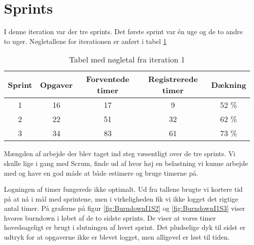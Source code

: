 \section{Sprints}

I denne iteration var der tre sprints. Det første sprint var én uge og de to andre to uger.
Nøgletallene for iterationen er anført i tabel \ref{table:iteration1sprints}

\begin{table}
\centering
\begin{tabular}{|c|c|c|c|c|}
\hline 
\textbf{Sprint} 	& \textbf{Opgaver} 	& \textbf{Forventede timer} 	& \textbf{Registrerede timer} 	& \textbf{Dækning} \\ 
\hline
1 		& 16 		& 17 				& 9 						& 52 \% \\ 
\hline 
2 		& 22 		& 51 				& 32						& 62 \% \\ 
\hline 
3 		& 34 		& 83 				& 61						& 73 \% \\ 
\hline 
\end{tabular}
\caption{Tabel med nøgletal fra iteration 1}
\label{table:iteration1sprints}
\end{table}

Mængden af arbejde der blev taget ind steg væsentligt over de tre sprints. Vi skulle lige i gang med Scrum, finde ud af hvor høj en belastning vi kunne arbejde med og have en god måde at både estimere og bruge timerne på.

Logningen af timer fungerede ikke optimalt. Ud fra tallene brugte vi kortere tid på at nå i mål med sprintene, men i virkeligheden fik vi ikke logget det rigtige antal timer. På graferne på figur \ref{fig:BurndownI1S2} og \ref{fig:BurndownI1S3} viser hvores burndown i løbet af de to sidste sprints. De viser at vores timer hovedsageligt er brugt i slutningen af hvert sprint. Det pludselige dyk til sidst er udtryk for at opgaverne ikke er blevet logget, men alligevel er løst til tiden.

\begin{minipage}{0.5\textwidth}
\end{minipage}
\begin{minipage}{0.5\textwidth}
\end{minipage}